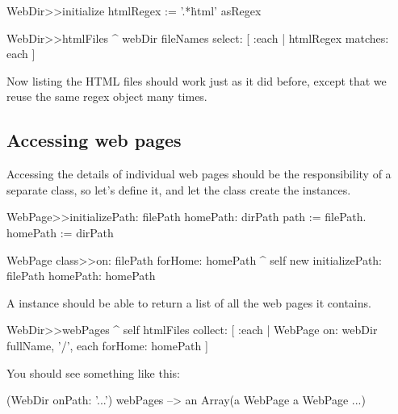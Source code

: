 \documentclass[a4paper,10pt,twoside]{book}
\begin{document}
\begin{code}{}
WebDir>>initialize
	htmlRegex := '.*\.html' asRegex

WebDir>>htmlFiles
	^ webDir fileNames select: [ :each | htmlRegex matches: each ]
\end{code}

Now listing the HTML files should work just as it did before, except that we reuse the same regex object many times.

\subsection{Accessing web pages}

Accessing the details of individual web pages should be the responsibility of a separate class, so let's define it, and let the  class create the instances.


\begin{code}{}
WebPage>>initializePath: filePath homePath: dirPath 
	path := filePath.
	homePath := dirPath

WebPage class>>on: filePath forHome: homePath
	^ self new initializePath: filePath homePath: homePath
\end{code}

A  instance should be able to return a list of all the web pages it contains.


\begin{code}{}
WebDir>>webPages
	^ self htmlFiles collect: 
		[ :each | WebPage 
			on: webDir fullName, '/', each
			forHome: homePath ]
\end{code}

You should see something like this:

\begin{code}{}
(WebDir onPath: '...') webPages --> an Array(a WebPage a WebPage ...)
\end{code}
\end{document}
